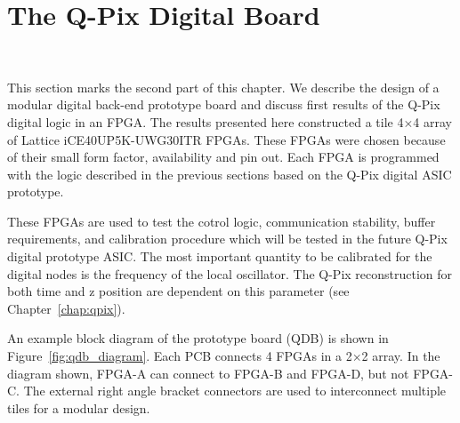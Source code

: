 \section{The Q-Pix Digital Board}~\label{sec:qdb_prototype}

This section marks the second part of this chapter.
We describe the design of a modular digital back-end prototype board and discuss first results of the Q-Pix digital logic in an FPGA.
The results presented here constructed a tile 4$\times$4 array of Lattice iCE40UP5K-UWG30ITR FPGAs.
These FPGAs were chosen because of their small form factor, availability and pin out.
Each FPGA is programmed with the logic described in the previous sections based on the Q-Pix digital ASIC prototype.

These FPGAs are used to test the cotrol logic, communication stability, buffer requirements, and calibration procedure which will be tested in the future Q-Pix digital prototype ASIC.
The most important quantity to be calibrated for the digital nodes is the frequency of the local oscillator.
The Q-Pix reconstruction for both time and z position are dependent on this parameter (see Chapter~\ref{chap:qpix}).

An example block diagram of the prototype board (QDB) is shown in Figure~\ref{fig:qdb_diagram}.
Each PCB connects 4 FPGAs in a 2$\times$2 array.
In the diagram shown, FPGA-A can connect to FPGA-B and FPGA-D, but not FPGA-C.
The external right angle bracket connectors are used to interconnect multiple tiles for a modular design.

